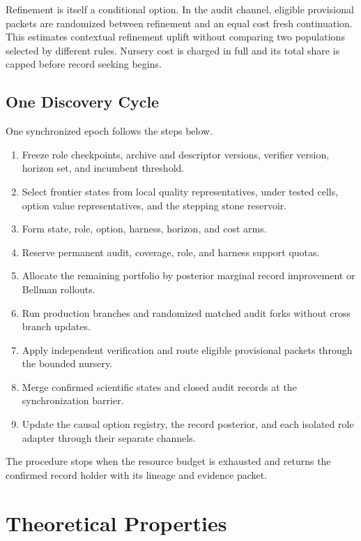 \documentclass{article}
\begin{document}
Refinement is itself a conditional option. In the audit channel, eligible provisional packets are randomized between refinement and an equal cost fresh continuation. This estimates contextual refinement uplift without comparing two populations selected by different rules. Nursery cost is charged in full and its total share is capped before record seeking begins.

\subsection{One Discovery Cycle}
\label{seccycle}

One synchronized epoch follows the steps below.

\begin{enumerate}
\item Freeze role checkpoints, archive and descriptor versions, verifier version, horizon set, and incumbent threshold.
\item Select frontier states from local quality representatives, under tested cells, option value representatives, and the stepping stone reservoir.
\item Form state, role, option, harness, horizon, and cost arms.
\item Reserve permanent audit, coverage, role, and harness support quotas.
\item Allocate the remaining portfolio by posterior marginal record improvement or Bellman rollouts.
\item Run production branches and randomized matched audit forks without cross branch updates.
\item Apply independent verification and route eligible provisional packets through the bounded nursery.
\item Merge confirmed scientific states and closed audit records at the synchronization barrier.
\item Update the causal option registry, the record posterior, and each isolated role adapter through their separate channels.
\end{enumerate}

The procedure stops when the resource budget is exhausted and returns the confirmed record holder with its lineage and evidence packet.

\section{Theoretical Properties}
\label{sectheory}
\end{document}
